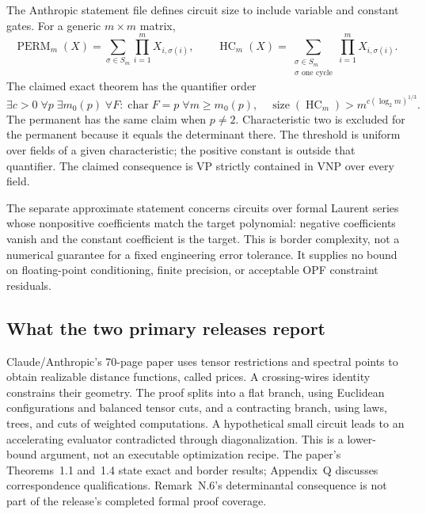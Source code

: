 \documentclass[11pt,letterpaper]{article}
\begin{document}
The Anthropic statement file defines circuit size to include variable and constant gates. For a generic $m\times m$ matrix,
\[
 \operatorname{PERM}_m(X)=\sum_{\sigma\in S_m}\prod_{i=1}^m X_{i,\sigma(i)},\qquad
 \operatorname{HC}_m(X)=\sum_{\substack{\sigma\in S_m\\\sigma\text{ one cycle}}}\prod_{i=1}^m X_{i,\sigma(i)}.
\]
The claimed exact theorem has the quantifier order
\begin{equation}
 \exists c>0\;\forall p\;\exists m_0(p)\;\forall F:\operatorname{char}F=p\;
 \forall m\ge m_0(p),\quad
 \operatorname{size}(\operatorname{HC}_m)>m^{c(\log_2m)^{1/3}} .
 \label{eq:vp}
\end{equation}
The permanent has the same claim when $p\ne2$. Characteristic two is excluded for the permanent because it equals the determinant there. The threshold is uniform over fields of a given characteristic; the positive constant is outside that quantifier. The claimed consequence is VP strictly contained in VNP over every field.\cite{anthropicstatement}

The separate approximate statement concerns circuits over formal Laurent series whose nonpositive coefficients match the target polynomial: negative coefficients vanish and the constant coefficient is the target. This is border complexity, not a numerical guarantee for a fixed engineering error tolerance. It supplies no bound on floating-point conditioning, finite precision, or acceptable OPF constraint residuals.\cite{anthropicstatement}

\subsection{What the two primary releases report}
Claude/Anthropic's 70-page paper uses tensor restrictions and spectral points to obtain realizable distance functions, called prices. A crossing-wires identity constrains their geometry. The proof splits into a flat branch, using Euclidean configurations and balanced tensor cuts, and a contracting branch, using laws, trees, and cuts of weighted computations. A hypothetical small circuit leads to an accelerating evaluator contradicted through diagonalization. This is a lower-bound argument, not an executable optimization recipe. The paper's Theorems~1.1 and~1.4 state exact and border results; Appendix~Q discusses correspondence qualifications. Remark~N.6's determinantal consequence is not part of the release's completed formal proof coverage.\cite{anthropic}
\end{document}
